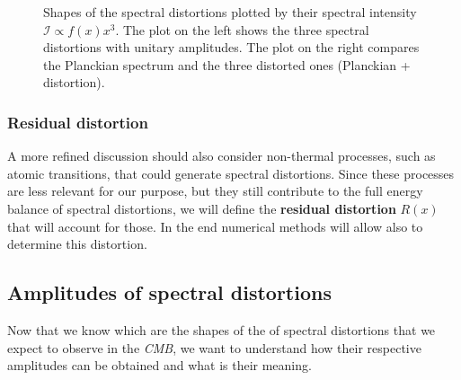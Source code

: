 \begin{figure}[h]
\begin{multicols}{2}
\end{multicols}
\caption{Shapes of the spectral distortions plotted by their spectral intensity $\mathcal{I}\propto f(x)x^3$. The plot on the left shows the three spectral distortions with unitary amplitudes. The plot on the right compares the Planckian spectrum and the three distorted ones (Planckian + distortion).}
\label{fig:SD_shapes}
\end{figure}

\subsubsection{Residual distortion}
A more refined discussion should also consider non-thermal processes, such as atomic transitions, that could generate spectral distortions. Since these processes are less relevant for our purpose, but they still contribute to the full energy balance of spectral distortions, we will define the \textbf{residual distortion} $R(x)$ that will account for those. In the end numerical methods will allow also to determine this distortion.
\subsection{Amplitudes of spectral distortions}\label{sec:SD_amplitudes}
Now that we know which are the shapes of the of spectral distortions that we expect to observe in the \emph{CMB}, we want to understand how their respective amplitudes can be obtained and what is their meaning.

